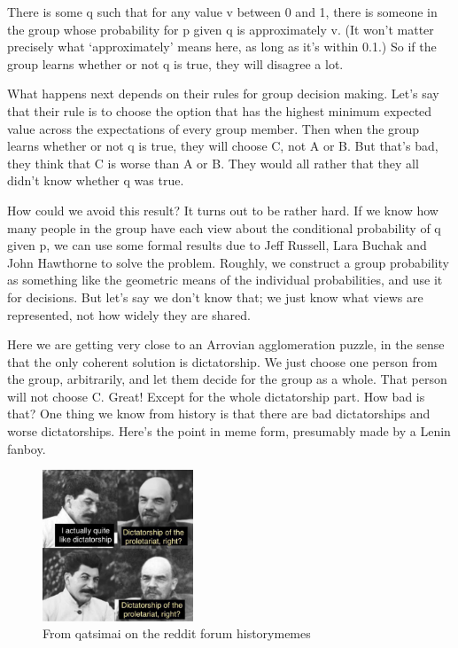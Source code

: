 \documentclass[
  12pt,
]{article}
\begin{document}
There is some q such that for any value v between 0 and 1, there is
someone in the group whose probability for p given q is approximately v.
(It won't matter precisely what `approximately' means here, as long as
it's within 0.1.) So if the group learns whether or not q is true, they
will disagree a lot.

What happens next depends on their rules for group decision making.
Let's say that their rule is to choose the option that has the highest
minimum expected value across the expectations of every group member.
Then when the group learns whether or not q is true, they will choose C,
not A or B. But that's bad, they think that C is worse than A or B. They
would all rather that they all didn't know whether q was true.

How could we avoid this result? It turns out to be rather hard. If we
know how many people in the group have each view about the conditional
probability of q given p, we can use some formal results due to Jeff
Russell, Lara Buchak and John Hawthorne to solve the problem. Roughly,
we construct a group probability as something like the geometric means
of the individual probabilities, and use it for decisions. But let's say
we don't know that; we just know what views are represented, not how
widely they are shared.

Here we are getting very close to an Arrovian agglomeration puzzle, in
the sense that the only coherent solution is dictatorship. We just
choose one person from the group, arbitrarily, and let them decide for
the group as a whole. That person will not choose C. Great! Except for
the whole dictatorship part. How bad is that? One thing we know from
history is that there are bad dictatorships and worse dictatorships.
Here's the point in meme form, presumably made by a Lenin fanboy.

\begin{figure}
\centering
\includegraphics[width=0.4\textwidth,height=\textheight]{dictatorship.jpg}
\caption{From qatsimai on the reddit forum historymemes}
\end{figure}
\end{document}
